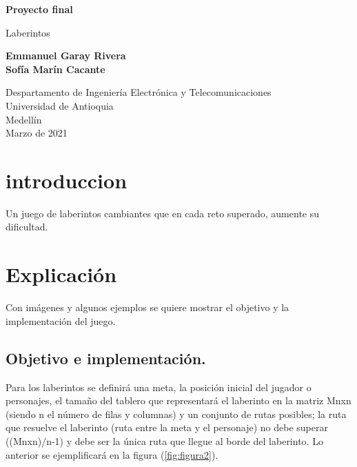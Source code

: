\documentclass{article}
\begin{document}
\begin{titlepage}
    \begin{center}
        \vspace*{1cm}
            
        \Huge
        \textbf{Proyecto final}
            
        \vspace{0.5cm}
        \LARGE
        Laberintos 
            
        \vspace{1.5cm}
            
        \textbf{Emmanuel Garay Rivera\\
        Sofía Marín Cacante}
            
        \vfill
            
        \vspace{0.8cm}
            
        \Large
        Despartamento de Ingeniería Electrónica y Telecomunicaciones\\
        Universidad de Antioquia\\
        Medellín\\
        Marzo de 2021
            
    \end{center}
\end{titlepage}

\tableofcontents
\newpage
\section{introduccion}\label{intro}
Un juego de laberintos cambiantes que en cada reto superado, aumente su dificultad. 

\section{Explicación} \label{contenido}
Con imágenes y algunos ejemplos se quiere mostrar el objetivo y la implementación del juego.
\subsection{Objetivo e implementación.}
Para los laberintos se definirá una meta, la posición inicial del jugador o personajes, el tamaño del tablero que representará el laberinto en la matriz Mnxn (siendo n el número de filas y columnas) y un conjunto de rutas posibles; la ruta que resuelve el laberinto (ruta entre la meta y el personaje) no debe superar ((Mnxn)/n-1) y debe ser la única ruta que llegue al borde del laberinto. Lo anterior se ejemplificará en la figura (\ref{fig:figura2}).
\end{document}

